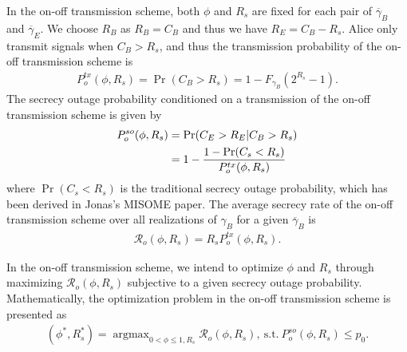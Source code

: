 \documentclass[journal]{IEEEtran}
\DeclareMathOperator*{\argmax}{argmax}
\begin{document}
In the on-off transmission scheme, both $\phi$ and $R_s$ are fixed for each pair of $\overline{\gamma}_B$ and $\overline{\gamma}_E$. We choose $R_B$ as $R_B = C_B$ and thus we have $R_E = C_B - R_s$. Alice only transmit signals when $C_B > R_s$, and thus the transmission probability of the on-off transmission scheme is
\begin{align}
P^{tx}_o(\phi, R_s) = \Pr(C_B > R_s) = 1-F_{\gamma_B}\left(2^{R_s}-1\right).
\end{align}
The secrecy outage probability conditioned on a transmission of the on-off transmission scheme is given by
\begin{align}
P^{so}_o(\phi, R_s) &= \Pr(C_E > R_E|C_B > R_s)\notag \\
&= 1 - \frac{1 - \Pr(C_s<R_s)}{P^{tx}_o(\phi, R_s)}
\end{align}
where $\Pr(C_s<R_s)$ is the traditional secrecy outage probability, which has been derived in Jonas's MISOME paper.
The average secrecy rate of the on-off transmission scheme over all realizations of $\gamma_B$ for a given $\overline{\gamma}_B$ is
\begin{align}
\mathcal{R}_o (\phi, R_s) = R_s P^{tx}_o(\phi, R_s).
\end{align}

In the on-off transmission scheme, we intend to optimize $\phi$ and $R_s$ through maximizing $\mathcal{R}_o (\phi, R_s)$ subjective to a given secrecy outage probability. Mathematically, the optimization problem in the on-off transmission scheme is presented as
\begin{align}\label{opt_on_off}
(\phi^{\ast}, R_s^{\ast}) \!=\! \argmax_{0< \phi \leq 1, R_s} \mathcal{R}_o (\phi, R_s), ~\text{s.t.}~ P^{so}_o(\phi, R_s) \leq p_0.
\end{align}
\end{document}
